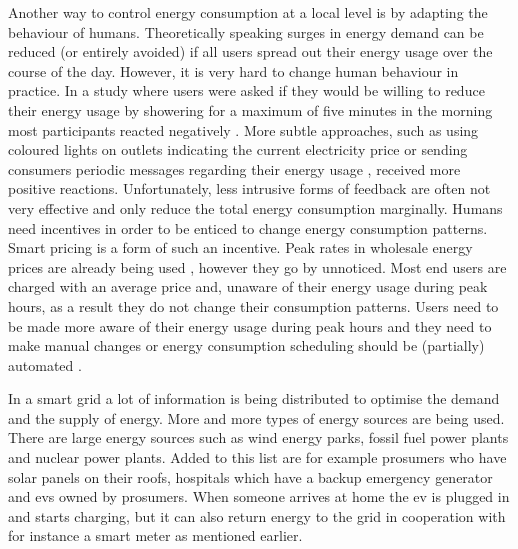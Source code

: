 Another way to control energy consumption at a local level is by adapting the behaviour of humans. Theoretically speaking surges in energy demand can be reduced (or entirely avoided) if all users spread out their energy usage over the course of the day. However, it is very hard to change human behaviour in practice. In a study where users were asked if they would be willing to reduce their energy usage by showering for a maximum of five minutes in the morning most participants reacted negatively \cite{GouldenBedwellRennick-EgglestoneEtAl2014}. More subtle approaches, such as using coloured lights on outlets indicating the current electricity price or sending consumers periodic messages regarding their energy usage \cite{AyresRasemanShih2012}, received more positive reactions. Unfortunately, less intrusive forms of feedback are often not very effective and only reduce the total energy consumption marginally. Humans need incentives in order to be enticed to change energy consumption patterns. Smart pricing is a form of such an incentive. Peak rates in wholesale energy prices are already being used \cite{SamadiMohsenian-RadSchoberEtAl2012}, however they go by unnoticed. Most end users are charged with an average price and, unaware of their energy usage during peak hours, as a result they do not change their consumption patterns. Users need to be made more aware of their energy usage during peak hours and they need to make manual changes \cite{Mohsenian-RadLeon-Garcia2010} or energy consumption scheduling should be (partially) automated \cite{SamadiMohsenian-RadSchoberEtAl2012}.

In a smart grid a lot of information is being distributed to optimise the demand and the supply of energy. More and more types of energy sources are being used. There are large energy sources such as wind energy parks, fossil fuel power plants and nuclear power plants. Added to this list are for example prosumers who have solar panels on their roofs, hospitals which have a backup emergency generator \cite{Kumagai2012} and \acp{ev} owned by prosumers. When someone arrives at home the \ac{ev} is plugged in and starts charging, but it can also return energy to the grid in cooperation with for instance a smart meter as mentioned earlier.

